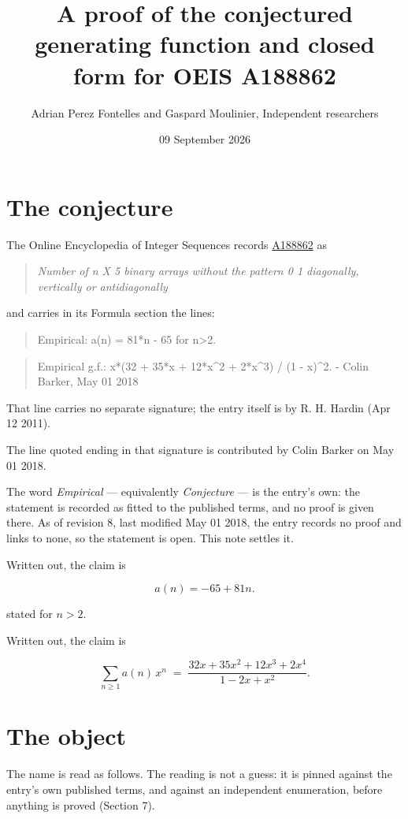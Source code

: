 \documentclass[11pt]{article}
\title{A proof of the conjectured generating function and closed form for OEIS A188862}
\author{Adrian Perez Fontelles and Gaspard Moulinier, Independent researchers}
\date{09 September 2026}
\theoremstyle{definition}
\begin{document}
\maketitle
\section{The conjecture}

The Online Encyclopedia of Integer Sequences records \href{https://oeis.org/A188862}{A188862} as

\begin{quote}\itshape Number of n X 5 binary arrays without the pattern 0 1 diagonally, vertically or antidiagonally\end{quote}

and carries in its Formula section the lines:

\begin{quote}\ttfamily Empirical: a(n) = 81*n - 65 for n>2.\end{quote}

\begin{quote}\ttfamily Empirical g.f.: x*(32 + 35*x + 12*x\textasciicircum{}2 + 2*x\textasciicircum{}3) / (1 - x)\textasciicircum{}2. - Colin Barker, May 01 2018\end{quote}

That line carries no separate signature; the entry itself is by R. H. Hardin (Apr 12 2011).

The line quoted ending in that signature is contributed by Colin Barker on May 01 2018.

The word {\itshape Empirical} --- equivalently {\itshape Conjecture} --- is the entry's own: the statement is recorded as fitted to the published terms, and no proof is given there. As of revision 8, last modified May 01 2018, the entry records no proof and links to none, so the statement is open. This note settles it.

Written out, the claim is

\[a(n) = -65 + 81n.\]

stated for $n > 2$.

Written out, the claim is

\[\sum_{n \ge 1} a(n)\,x^n \;=\; \frac{32x + 35x^{2} + 12x^{3} + 2x^{4}}{1 - 2x + x^{2}}.\]

\section{The object}

The name is read as follows. The reading is not a guess: it is pinned against the entry's own published terms, and against an independent enumeration, before anything is proved (Section 7).
\end{document}
